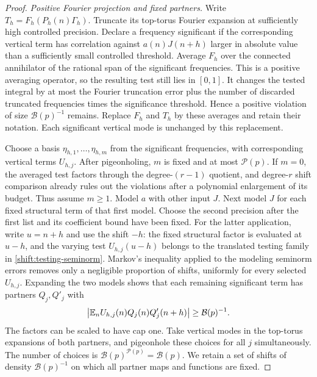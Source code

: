 \begin{proof}
\emph{Positive Fourier projection and fixed partners.}
Write $T_h=F_h(P_h(n)\Gamma_h)$.
Truncate its top-torus Fourier expansion at sufficiently high
controlled precision.  Declare a frequency significant if the
corresponding vertical term has correlation against $a(n)J(n+h)$
larger in absolute value than a sufficiently small controlled
threshold.  Average $F_h$ over the connected annihilator of the
rational span of the significant frequencies.
This is a positive averaging operator, so the resulting test
still lies in $[0,1]$.  It changes the tested integral by at most
the Fourier truncation error plus the number of discarded truncated frequencies
times the significance threshold.  Hence a positive violation of
size $\mathcal B(p)^{-1}$ remains.  Replace $F_h$ and $T_h$ by
these averages and retain their notation.  Each significant vertical
mode is unchanged by this replacement.

Choose a basis $\eta_{h,1},\ldots,\eta_{h,m}$ from the significant
frequencies, with corresponding vertical terms $U_{h,j}$.
After pigeonholing, $m$ is fixed and at most $\mathcal P(p)$.
If $m=0$, the averaged test factors through the degree-$(r-1)$
quotient, and degree-$r$ shift comparison already rules out the
violations after a polynomial enlargement of its budget.  Thus
assume $m\geq1$.
Model $a$ with other input $J$.  Next model $J$ for each fixed
structural term of that first model.  Choose the second precision
after the first list and its coefficient bound have been fixed.
For the latter application, write $u=n+h$ and use the shift $-h$:
the fixed structural factor is evaluated at $u-h$, and the varying
test $U_{h,j}(u-h)$ belongs to the translated testing family in
\eqref{shift:testing-seminorm}.
Markov's inequality applied to the modeling seminorm errors removes
only a negligible proportion of shifts, uniformly for every
selected $U_{h,j}$.  Expanding the two models shows that each
remaining significant term has partners $Q_j,Q'_j$ with
\begin{equation}\label{shift:partner-bias}
 \left|\mathbb E_n U_{h,j}(n)Q_j(n)Q'_j(n+h)\right|
 \geq\mathcal B(p)^{-1}.
\end{equation}
The factors can be scaled to have cap one.
Take vertical modes in the top-torus expansions of both partners,
and pigeonhole these choices for all $j$ simultaneously.
The number of choices is $\mathcal B(p)^{\mathcal P(p)}
=\mathcal B(p)$.  We retain a set of shifts of density
$\mathcal B(p)^{-1}$ on which all partner maps and functions
are fixed.


\end{proof}
